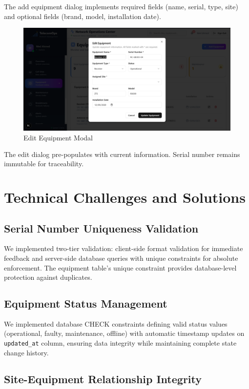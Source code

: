 The add equipment dialog implements required fields (name, serial, type, site) and optional fields (brand, model, installation date).

\begin{figure}[H]
    \centering
    \includegraphics[width=0.6\linewidth]{img/chap_04/edit_equipment_dialog.png}
    \caption{Edit Equipment Modal}
    \label{fig:edit_equipment_modal}
\end{figure}

The edit dialog pre-populates with current information. Serial number remains immutable for traceability.

\section{Technical Challenges and Solutions}

\subsection{Serial Number Uniqueness Validation}

We implemented two-tier validation: client-side format validation for immediate feedback and server-side database queries with unique constraints for absolute enforcement. The equipment table's unique constraint provides database-level protection against duplicates.

\subsection{Equipment Status Management}

We implemented database CHECK constraints defining valid status values (operational, faulty, maintenance, offline) with automatic timestamp updates on \texttt{updated\_at} column, ensuring data integrity while maintaining complete state change history.

\subsection{Site-Equipment Relationship Integrity}

